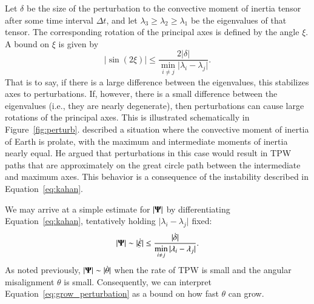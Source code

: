 \documentclass[preprint,12pt,authoryear]{elsarticle}
\newcommand{\mitbf}[1]{\hbox{\mathversion{bold}$#1$}}
\begin{document}
Let $\delta$ be the size of the perturbation to the convective moment of inertia tensor after some time interval $\Delta t$, and let $\lambda_3 \ge \lambda_2 \ge \lambda_1$ be the eigenvalues of that tensor.  The corresponding rotation of the principal axes is defined by the angle $\xi$. A bound on $\xi$ is given by 
\begin{equation}
\vert \sin(2 \xi) \vert \le \frac{ 2 \vert \delta \vert}{ \displaystyle \min_{i \neq j} \vert \lambda_i - \lambda_j \vert }.
\label{eq:kahan}
\end{equation} 
That is to say, if there is a large difference between the eigenvalues, this stabilizes axes to perturbations.  
If, however, there is a small difference between the eigenvalues (i.e., they are nearly degenerate), then perturbations can cause large rotations of the principal axes.
This is illustrated schematically in Figure~\ref{fig:perturb}.
\citet{evans1998true} described a situation where the convective moment of inertia of Earth is prolate, with the
maximum and intermediate moments of inertia nearly equal.
He argued that perturbations in this case would result in TPW paths that are approximately
on the great circle path between the intermediate and maximum axes.
This behavior is a consequence of the instability described in Equation~\eqref{eq:kahan}.

We may arrive at a simple estimate for $|\mitbf{\Psi}|$  
by differentiating Equation~\eqref{eq:kahan}, tentatively holding $\vert \lambda_i - \lambda_j \vert$ fixed:
\begin{equation}
\vert \mitbf{\Psi} \vert \sim \vert \dot{\xi} \vert \le \frac{ \vert \dot{\delta} \vert}{ \displaystyle \min_{i \neq j} \vert \lambda_i - \lambda_j \vert }.
\label{eq:grow_perturbation}
\end{equation} 
As noted previously, $|\mitbf{\Psi}|\sim |\dot\theta |$ when the rate of TPW is small and the angular misalignment $\theta$ is small. 
Consequently, we can interpret Equation~\eqref{eq:grow_perturbation} as a bound on how fast $\theta$ can grow.
\end{document}
